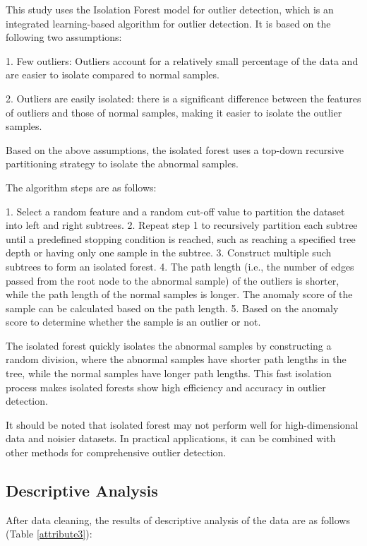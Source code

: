 \documentclass[
  journal=medium,
  manuscript=Report,
  year=2023,
  volume=37,
]{cup-journal}
\begin{document}
This study uses the Isolation Forest model for outlier detection, which is an integrated learning-based algorithm for outlier detection. It is based on the following two assumptions:

1. Few outliers: Outliers account for a relatively small percentage of the data and are easier to isolate compared to normal samples.

2. Outliers are easily isolated: there is a significant difference between the features of outliers and those of normal samples, making it easier to isolate the outlier samples.

Based on the above assumptions, the isolated forest uses a top-down recursive partitioning strategy to isolate the abnormal samples.

The algorithm steps are as follows:

1. Select a random feature and a random cut-off value to partition the dataset into left and right subtrees.
2. Repeat step 1 to recursively partition each subtree until a predefined stopping condition is reached, such as reaching a specified tree depth or having only one sample in the subtree.
3. Construct multiple such subtrees to form an isolated forest.
4. The path length (i.e., the number of edges passed from the root node to the abnormal sample) of the outliers is shorter, while the path length of the normal samples is longer. The anomaly score of the sample can be calculated based on the path length.
5. Based on the anomaly score to determine whether the sample is an outlier or not.

The isolated forest quickly isolates the abnormal samples by constructing a random division, where the abnormal samples have shorter path lengths in the tree, while the normal samples have longer path lengths. This fast isolation process makes isolated forests show high efficiency and accuracy in outlier detection.

It should be noted that isolated forest may not perform well for high-dimensional data and noisier datasets. In practical applications, it can be combined with other methods for comprehensive outlier detection.

\subsection{Descriptive Analysis}

After data cleaning, the results of descriptive analysis of the data are as follows (Table \ref{attribute3}):
\end{document}
